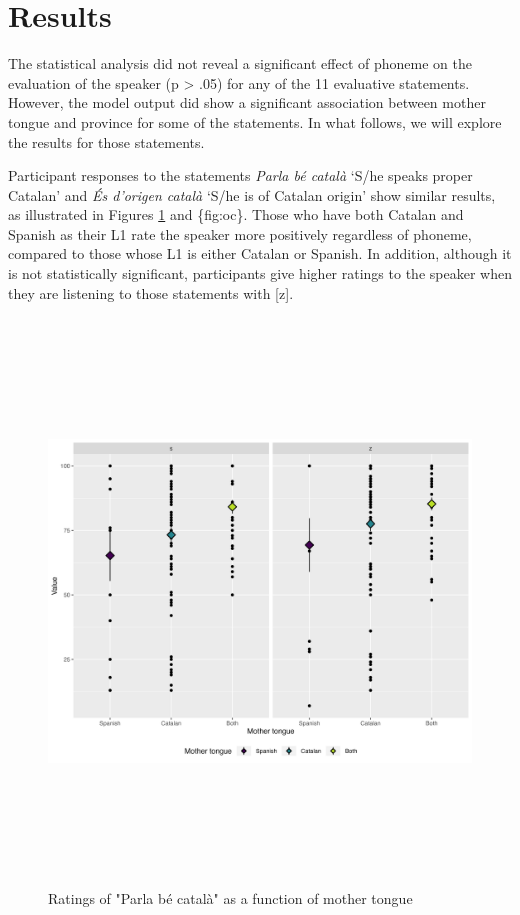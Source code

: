\documentclass[
  a4paper,
  11pt,
  twocolumn]{article}
\begin{document}
\section{Results}

The statistical analysis did not reveal a significant effect of phoneme
on the evaluation of the speaker (p \textgreater{} .05) for any of the
11 evaluative statements. However, the model output did show a
significant association between mother tongue and province for some of
the statements. In what follows, we will explore the results for those
statements.

Participant responses to the statements \emph{Parla bé català} `S/he
speaks proper Catalan' and \emph{És d'origen català} `S/he is of Catalan
origin' show similar results, as illustrated in Figures \ref{fig:pbc}
and \{fig:oc\}. Those who have both Catalan and Spanish as their L1 rate
the speaker more positively regardless of phoneme, compared to those
whose L1 is either Catalan or Spanish. In addition, although it is not
statistically significant, participants give higher ratings to the
speaker when they are listening to those statements with {[}z{]}.

\begin{figure}[!ht]
\begin{center}
\includegraphics[height=15cm]{./includes/figures/pbc.png}
\caption{Ratings of "Parla bé català" as a function of mother tongue}\label{fig:pbc}
\end{center}
\end{figure}
\end{document}
